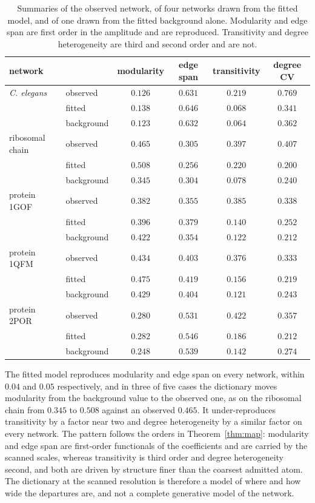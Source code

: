 \documentclass[11pt]{article}
\theoremstyle{definition}
\newcommand{\1}{\mathbf 1}\newcommand{\op}{\operatorname}
\begin{document}
\begin{table}[t]\centering
\caption{Summaries of the observed network, of four networks drawn from the
fitted model, and of one drawn from the fitted background alone.  Modularity
and edge span are first order in the amplitude and are reproduced.
Transitivity and degree heterogeneity are third and second order and are
not.}                                                   \label{tab:gencheck}
\begin{tabular}{llcccc}
\hline
network & & modularity & edge span & transitivity & degree CV\\
\hline
\emph{C. elegans} & observed & $0.126$ & $0.631$ & $0.219$ & $0.769$\\
                  & fitted   & $0.138$ & $0.646$ & $0.068$ & $0.341$\\
                  & background & $0.123$ & $0.632$ & $0.064$ & $0.362$\\
ribosomal chain   & observed & $0.465$ & $0.305$ & $0.397$ & $0.407$\\
                  & fitted   & $0.508$ & $0.256$ & $0.220$ & $0.200$\\
                  & background & $0.345$ & $0.304$ & $0.078$ & $0.240$\\
protein 1GOF      & observed & $0.382$ & $0.355$ & $0.385$ & $0.338$\\
                  & fitted   & $0.396$ & $0.379$ & $0.140$ & $0.252$\\
                  & background & $0.422$ & $0.354$ & $0.122$ & $0.212$\\
protein 1QFM      & observed & $0.434$ & $0.403$ & $0.376$ & $0.333$\\
                  & fitted   & $0.475$ & $0.419$ & $0.156$ & $0.219$\\
                  & background & $0.429$ & $0.404$ & $0.121$ & $0.243$\\
protein 2POR      & observed & $0.280$ & $0.531$ & $0.422$ & $0.357$\\
                  & fitted   & $0.282$ & $0.546$ & $0.186$ & $0.212$\\
                  & background & $0.248$ & $0.539$ & $0.142$ & $0.274$\\
\hline
\end{tabular}
\end{table}

The fitted model reproduces modularity and edge span on every network, within
$0.04$ and $0.05$ respectively, and in three of five cases the dictionary
moves modularity from the background value to the observed one, as on the
ribosomal chain from $0.345$ to $0.508$ against an observed $0.465$.  It
under-reproduces transitivity by a factor near two and degree heterogeneity
by a similar factor on every network.  The pattern follows the orders in
Theorem~\ref{thm:map}: modularity and edge span are first-order functionals of
the coefficients and are carried by the scanned scales, whereas transitivity
is third order and degree heterogeneity second, and both are driven by
structure finer than the coarsest admitted atom.  The dictionary at the
scanned resolution is therefore a model of where and how wide the departures
are, and not a complete generative model of the network.
\end{document}
